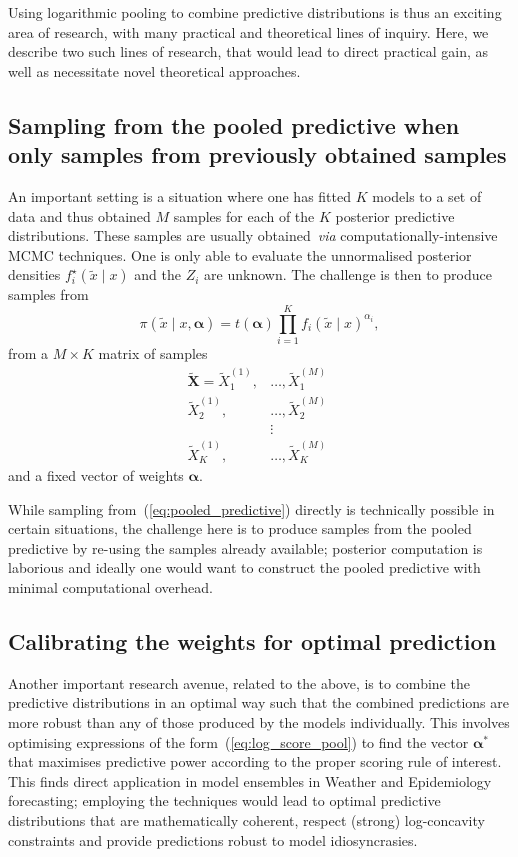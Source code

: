 \documentclass[a4paper, notitlepage, 11pt]{article}
\begin{document}
Using logarithmic pooling to combine predictive distributions is thus an exciting area of research, with many practical and theoretical lines of inquiry.
Here, we describe two such lines of research, that would lead to direct practical gain, as well as necessitate novel theoretical approaches.

\subsection{Sampling from the pooled predictive when only samples from previously obtained samples}
\label{sec:subproj1}

An important setting is a situation where one has fitted $K$ models to a set of data and thus obtained $M$ samples for each of the $K$ posterior predictive distributions.
These samples are usually obtained~\textit{via} computationally-intensive MCMC techniques.
One is only able to evaluate the unnormalised posterior densities $f_i^\star(\tilde{x} \mid x)$ and the $Z_i$ are unknown.
The challenge is then to produce samples from
\begin{equation}
\label{eq:pooled_predictive}
 \pi(\tilde{x} \mid x, \boldsymbol{\alpha}) = t(\boldsymbol{\alpha}) \prod_{i=1}^K f_i(\tilde{x} \mid x)^{\alpha_i},
\end{equation}
from a $M \times K$ matrix of samples
\begin{align*}
\boldsymbol{\tilde{X}} = \tilde{X}_1^{(1)},&\ldots, \tilde{X}_1^{(M)}\\
\tilde{X}_2^{(1)},&\ldots, \tilde{X}_2^{(M)}\\ 
&\vdots\\
\tilde{X}_K^{(1)},& \ldots, \tilde{X}_K^{(M)}\,\
\end{align*}
and a fixed vector of weights $\boldsymbol{\alpha}$.

While sampling from~(\ref{eq:pooled_predictive}) directly is technically possible in certain situations, the challenge here is to produce samples from the pooled predictive by re-using the samples already available; posterior computation is laborious and ideally one would want to construct the pooled predictive with minimal computational overhead.

\subsection{Calibrating the weights for optimal prediction}
\label{sec:subproj2}

Another important research avenue, related to the above, is to combine the predictive distributions in an optimal way such that the combined predictions are more robust than any of those produced by the models individually.
This involves optimising expressions of the form~(\ref{eq:log_score_pool}) to find the vector $\boldsymbol{\alpha}^\ast$ that maximises predictive power according to the proper scoring rule of interest.
This finds direct application in model ensembles in Weather and Epidemiology forecasting; employing the techniques would lead to optimal predictive distributions that are mathematically coherent, respect (strong) log-concavity constraints and provide predictions robust to model idiosyncrasies.


\end{document}
